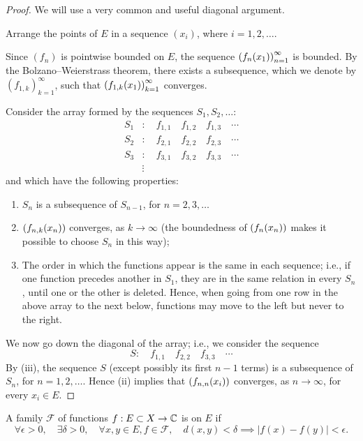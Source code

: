 \begin{proof}
We will use a very common and useful diagonal argument.

Arrange the points of $E$ in a sequence $(x_i)$, where $i=1,2,\dots$. 

Since $(f_n)$ is pointwise bounded on $E$, the sequence $\left(f_n(x_1)\right)_{n=1}^{\infty}$ is bounded. By the Bolzano--Weierstrass theorem, there exists a subsequence, which we denote by $(f_{1,k})_{k=1}^{\infty}$, such that $\left(f_{1,k}(x_1)\right)_{k=1}^{\infty}$ converges.

Consider the array formed by the sequences $S_1,S_2,\dots$:
\begin{align*}
S_1&:\quad f_{1,1}\quad f_{1,2}\quad f_{1,3}\quad\cdots\\
S_2&:\quad f_{2,1}\quad f_{2,2}\quad f_{2,3}\quad\cdots\\
S_3&:\quad f_{3,1}\quad f_{3,2}\quad f_{3,3}\quad\cdots\\
&\vdots
\end{align*}
and which have the following properties:
\begin{enumerate}[label=(\roman*)]
\item $S_n$ is a subsequence of $S_{n-1}$, for $n=2,3,\dots$
\item $\left(f_{n,k}(x_n)\right)$ converges, as $k\to\infty$ (the boundedness of $\left(f_n(x_n)\right)$ makes it possible to choose $S_n$ in this way);
\item The order in which the functions appear is the same in each sequence; i.e., if one function precedes another in $S_1$, they are in the same relation in every $S_n$, until one or the other is deleted. Hence, when going from one row in the above array to the next below, functions may move to the left but never to the right.
\end{enumerate}

We now go down the diagonal of the array; i.e., we consider the sequence
\[S:\quad f_{1,1}\quad f_{2,2}\quad f_{3,3}\quad\cdots\]
By (iii), the sequence $S$ (except possibly its first $n-1$ terms) is a subsequence of $S_n$, for $n=1,2,\dots$. 
Hence (ii) implies that $\left(f_{n,n}(x_i)\right)$ converges, as $n\to\infty$, for every $x_i\in E$.
\end{proof}

\begin{definition}
A family $\mathscr{F}$ of functions $f:E\subset X\to\mathbb C$ is  on $E$ if
\[\forall\epsilon>0,\quad\exists\delta>0,\quad\forall x,y\in E,f\in\mathscr{F},\quad d(x,y)<\delta\implies|f(x)-f(y)|<\epsilon.\]
\end{definition}

